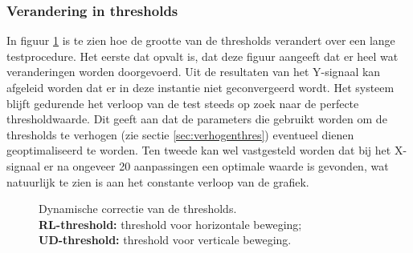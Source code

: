\documentclass{article}
\newcommand{\figwidth}{0.85\linewidth}
\begin{document}
\subsubsection*{Verandering in thresholds}
In figuur \ref{fig:resthresholds} is te zien hoe de grootte van de thresholds verandert over een lange testprocedure. Het eerste dat opvalt is, dat deze figuur aangeeft dat er heel wat veranderingen worden doorgevoerd. Uit de resultaten van het Y-signaal kan afgeleid worden dat er in deze instantie niet geconvergeerd wordt. Het systeem blijft gedurende het verloop van de test steeds op zoek naar de perfecte thresholdwaarde. Dit geeft aan dat de parameters die gebruikt worden om de thresholds te verhogen (zie sectie \ref{sec:verhogenthres})  eventueel dienen geoptimaliseerd te worden. Ten tweede kan wel vastgesteld worden dat bij het X-signaal er na ongeveer 20 aanpassingen een optimale waarde is gevonden, wat natuurlijk te zien is aan het constante verloop van de grafiek.
\begin{figure}[H]
	\centering
	\caption{Dynamische correctie van de thresholds.\\\textbf{RL-threshold:} threshold voor horizontale beweging;\\\textbf{UD-threshold:} threshold voor verticale beweging.}
	\label{fig:resthresholds}
\end{figure}
\end{document}
